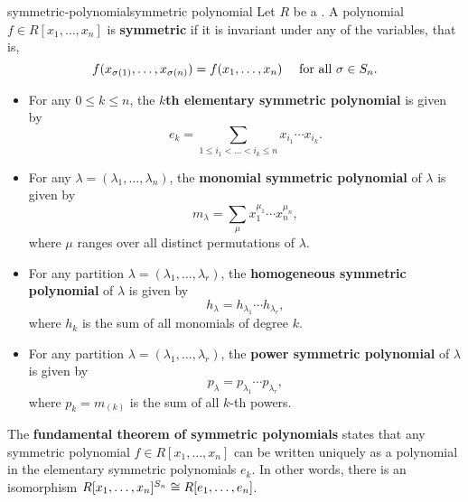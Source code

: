 \begin{topic}{symmetric-polynomial}{symmetric polynomial}
    Let $R$ be a . A polynomial $f \in R[x_1, \ldots, x_n]$ is \textbf{symmetric} if it is invariant under any  of the variables, that is,
    \[ f(x_{\sigma(1)}, \ldots, x_{\sigma(n)}) = f(x_1, \ldots, x_n) \quad \textup{ for all } \sigma \in S_n . \]
    \begin{itemize}
        \item For any $0 \le k \le n$, the \textbf{$k$th elementary symmetric polynomial} is given by
        \[ e_k = \sum_{1 \le i_1 < \ldots < i_k \le n} x_{i_1} \cdots x_{i_k} . \]
        \item For any  $\lambda = (\lambda_1, \ldots, \lambda_n)$, the \textbf{monomial symmetric polynomial} of $\lambda$ is given by
        \[ m_\lambda = \sum_{\mu} x_1^{\mu_1} \cdots x_n^{\mu_n} , \]
        where $\mu$ ranges over all distinct permutations of $\lambda$.
        \item For any partition $\lambda = (\lambda_1, \ldots, \lambda_r)$, the \textbf{homogeneous symmetric polynomial} of $\lambda$ is given by
        \[ h_\lambda = h_{\lambda_1} \cdots h_{\lambda_r} , \]
        where $h_k$ is the sum of all monomials of degree $k$.
        \item For any partition $\lambda = (\lambda_1, \ldots, \lambda_r)$, the \textbf{power symmetric polynomial} of $\lambda$ is given by
        \[ p_\lambda = p_{\lambda_1} \cdots p_{\lambda_r} , \]
        where $p_k = m_{(k)}$ is the sum of all $k$-th powers.
    \end{itemize}
    The \textbf{fundamental theorem of symmetric polynomials} states that any symmetric polynomial $f \in R[x_1, \ldots, x_n]$ can be written uniquely as a polynomial in the elementary symmetric polynomials $e_k$. In other words, there is an isomorphism $R[x_1, \ldots, x_n]^{S_n} \cong R[e_1, \ldots, e_n]$.
\end{topic}

